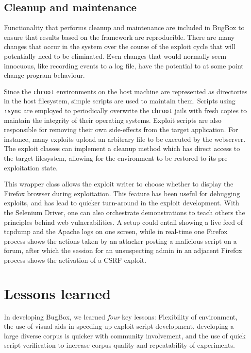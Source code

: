 \documentclass[letterpaper,twocolumn,10pt]{article}
\begin{document}
\subsection {Cleanup and maintenance}


Functionality that performs cleanup and maintenance are included in BugBox to ensure that results based on the framework are reproducible. There are many changes that occur in the system over the course of the exploit cycle that will potentially need to be eliminated. Even changes that would normally seem innocuous, like recording events to a log file, have the potential to at some point change program behaviour.  

Since the {\tt chroot} environments on the host machine are represented as directories in the host filesystem, simple scripts are used to maintain them.  Scripts using {\tt rsync} are employed to periodically overwrite the {\tt chroot} jails with fresh copies to maintain the integrity of their operating systems. Exploit scripts are also responsible for removing their own side-effects from the target application. For instance, many exploits upload an arbitrary file to be executed by the webserver. The exploit classes can implement a cleanup method which has direct access to the target filesystem, allowing for the environment to be restored to its pre-exploitation state. 

This wrapper class allows the exploit writer to choose whether to display the Firefox browser during exploitation. This feature has been useful for debugging exploits, and has lead to quicker turn-around in the exploit development. With the Selenium Driver, one can also orchestrate demonstrations to teach others the principles behind web vulnerabilities.  A setup could entail showing a live feed of tcpdump and the Apache logs on one screen, while in real-time one Firefox process shows the actions taken by an attacker posting a malicious script on a forum, after which the session for an unsuspecting admin in an adjacent Firefox process shows the activation of a CSRF exploit. 

\section {Lessons learned}

In developing BugBox, we learned {\em four} key lessons: Flexibility of environment, the use of visual aids in speeding up exploit script development, developing a large diverse corpus is quicker with community involvement, and the use of quick script verification to increase corpus quality and repeatability of experiments.\par
\end{document}
